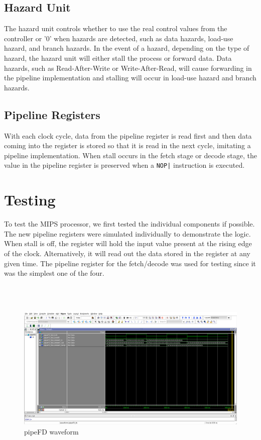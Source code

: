 \documentclass{article}
\begin{document}
	\subsection{Hazard Unit}
	The hazard unit controls whether to use the real control values from the controller or '0' when hazards are detected, such as data hazards, load-use hazard, and branch hazards. In the event of a hazard, depending on the type of hazard, the hazard unit will either stall the process or forward data. Data hazards, such as Read-After-Write or Write-After-Read, will cause forwarding in the pipeline implementation and stalling will occur in load-use hazard and branch hazards.
		
	\subsection{Pipeline Registers}
	With each clock cycle, data from the pipeline register is read first and then data coming into the register is stored so that it is read in the next cycle, imitating a pipeline implementation. When stall occurs in the fetch stage or decode stage, the value in the pipeline register is preserved when a \texttt{NOP|} instruction is executed. 
		
\section{Testing}
	To test the MIPS processor, we first tested the individual components if possible. The new pipeline registers were simulated individually to demonstrate the logic. When stall is off, the register will hold the input value present at the rising edge of the clock. Alternatively, it will read out the data stored in the register at any given time. The pipeline register for the fetch/decode was used for testing since it was the simplest one of the four.

\\ \\
\begin{figure}[!ht]
	\centering
		\includegraphics[width=1\textwidth]{pipeFD_waveform.png}
		\caption{pipeFD waveform}
\end{figure}
\\ \\
\end{document}
